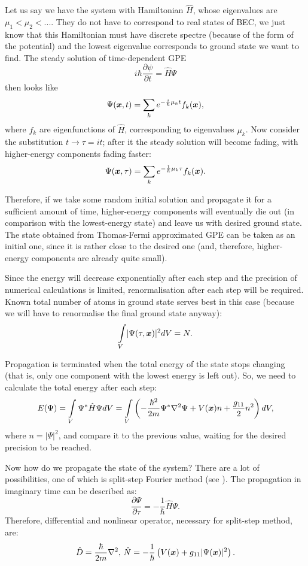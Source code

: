 Let us say we have the system with Hamiltonian $\hat{H}$, whose eigenvalues are $\mu_1 < \mu_2 < ...$.
They do not have to correspond to real states of BEC, we just know that this Hamiltonian must have discrete spectre
(because of the form of the potential) and the lowest eigenvalue corresponds to ground state we want to find.
The steady solution of time-dependent GPE
\[
	i \hbar \frac{\partial \psi}{\partial t} = \hat{H} \Psi
\]
then looks like
\[
	\Psi(\boldsymbol{x}, t) = \sum_k e^{-\frac{i}{\hbar}\mu_k t} f_k(\boldsymbol{x}),
\]
where $f_k$ are eigenfunctions of $\hat{H}$, corresponding to eigenvalues $\mu_k$.
Now consider the substitution $t \rightarrow \tau = it$; after it the steady solution will become fading,
with higher-energy components fading faster:
\[
	\Psi(\boldsymbol{x}, \tau) = \sum_k e^{-\frac{1}{\hbar}\mu_k \tau} f_k(\boldsymbol{x}).
\]

Therefore, if we take some random initial solution and propagate it for a sufficient amount of time,
higher-energy components will eventually die out (in comparison with the lowest-energy state)
and leave us with desired ground state.
The state obtained from Thomas-Fermi approximated GPE can be taken as an initial one,
since it is rather close to the desired one (and, therefore, higher-energy components are already quite small).

Since the energy will decrease exponentially after each step and the precision of numerical calculations is limited,
renormalisation after each step will be required.
Known total number of atoms in ground state serves best in this case
(because we will have to renormalise the final ground state anyway):
\[
	\int\limits_V \lvert \Psi(\tau, \boldsymbol{x}) \rvert^2 dV = N.
\]

Propagation is terminated when the total energy of the state stops changing
(that is, only one component with the lowest energy is left out).
So, we need to calculate the total energy after each step:
\[
	E(\Psi) = \int\limits_V \Psi^* \hat{H} \Psi dV
	= \int\limits_V \left(
		-\frac{\hbar^2}{2 m} \Psi^* \nabla^2 \Psi + V(\boldsymbol{x}) n + \frac{g_{11}}{2} n^2
	\right) dV,
\]
where $n = \lvert \Psi \rvert^2$,
and compare it to the previous value, waiting for the desired precision to be reached.

Now how do we propagate the state of the system?
There are a lot of possibilities, one of which is split-step Fourier method (see ).
The propagation in imaginary time can be described as:
\[
	\frac{\partial \Psi}{\partial \tau} = - \frac{1}{\hbar} \hat{H} \Psi.
\]
Therefore, differential and nonlinear operator, necessary for split-step method, are:
\[
	\hat{D} = \frac{\hbar}{2 m}\nabla^2,\,
	\hat{N} = -\frac{1}{\hbar}\left( V(\boldsymbol{x}) + g_{11} \lvert \Psi(\boldsymbol{x}) \rvert^2 \right).
\]


